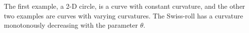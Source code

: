 \documentclass{article}
\theoremstyle{remark}
\newtheorem*{remark}{Remark}
\newtheorem{example}{Example}
\begin{document}
The first example, a 2-D circle, is a curve with constant curvature, and the other two examples are curves with varying curvatures. The Swiss-roll has a curvature monotonously decreasing with the parameter $\theta$. %
\end{document}
